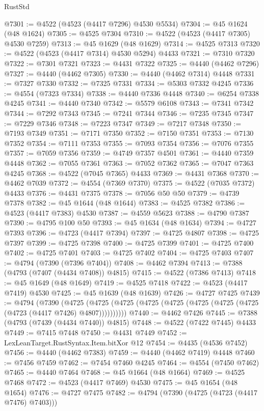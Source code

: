 \begin{lexlean}{RustStd}
\begin{coremodule}
@7301 := @4522 (@4523 (@4417 @7296) @4530 @5534)
@7304 := @45 @1624 (@48 @1624)
@7305 := @4525 @7304
@7310 := @4522 (@4523 (@4417 @7305) @4530 @7259)
@7313 := @45 @1629 (@48 @1629)
@7314 := @4525 @7313
@7320 := @4522 (@4523 (@4417 @7314) @4530 @5294) @4433
@7321 := @7310 @7320
@7322 := @7301 @7321
@7323 := @4431 @7322
@7325 := @4440 (@4462 @7296)
@7327 := @4440 (@4462 @7305)
@7330 := @4440 (@4462 @7314) @4448
@7331 := @7327 @7330
@7332 := @7325 @7331
@7334 := @5303 @7332 @4245
@7336 := @4554 (@7323 @7334)
@7338 := @4440 @7336 @4448
@7340 := @6254 @7338 @4245
@7341 := @4440 @7340
@7342 := @5579 @6108
@7343 := @7341 @7342
@7344 := @7292 @7343
@7345 := @7241 @7344
@7346 := @7235 @7345
@7347 := @7229 @7346
@7348 := @7223 @7347
@7349 := @7217 @7348
@7350 := @7193 @7349
@7351 := @7171 @7350
@7352 := @7150 @7351
@7353 := @7130 @7352
@7354 := @7111 @7353
@7355 := @7093 @7354
@7356 := @7076 @7355
@7357 := @7059 @7356
@7359 := @4749 @7357 @4501
@7361 := @4440 @7359 @4448
@7362 := @7055 @7361
@7363 := @7052 @7362
@7365 := @7047 @7363 @4245
@7368 := @4522 (@7045 @7365) @4433
@7369 := @4431 @7368
@7370 := @4462 @7039
@7372 := @4554 (@7369 @7370)
@7375 := @4522 (@7035 @7372) @4433
@7376 := @4431 @7375
@7378 := @7056 @50 @50
@7379 := @4739 @7378
@7382 := @45 @1644 (@48 @1644)
@7383 := @4525 @7382
@7386 := @4523 (@4417 @7383) @4530
@7387 := @4559 @5623
@7388 := @4790 @7387
@7390 := @4795 @100 @50
@7393 := @45 @1634 (@48 @1634)
@7394 := @4727 @7393
@7396 := @4723 (@4417 @7394)
@7397 := @4725 @4807
@7398 := @4725 @7397
@7399 := @4725 @7398
@7400 := @4725 @7399
@7401 := @4725 @7400
@7402 := @4725 @7401
@7403 := @4725 @7402
@7404 := @4725 @7403
@7407 := @4794 (@7390 (@7396 @7404))
@7408 := @4462 @7394
@7413 := @7388 (@4793 (@7407 (@4434 @7408)) @4815)
@7415 := @4522 (@7386 @7413)
@7418 := @45 @1649 (@48 @1649)
@7419 := @4525 @7418
@7422 := @4523 (@4417 @7419) @4530
@7425 := @45 @1639 (@48 @1639)
@7426 := @4727 @7425
@7439 := @4794
    (@7390
      (@4725 (@4725 (@4725 (@4725 (@4725 (@4725 (@4725 (@4725 (@4723 (@4417 @7426) @4807))))))))))
@7440 := @4462 @7426
@7445 := @7388 (@4793 (@7439 (@4434 @7440)) @4815)
@7448 := @4522 (@7422 @7445) @4433
@7449 := @7415 @7448
@7450 := @4431 @7449
@7452 := LexLeanTarget.RustSyntax.Item.bitXor @12
@7454 := @4435 (@4536 @7452)
@7456 := @4440 (@4462 @7383)
@7459 := @4440 (@4462 @7419) @4448
@7460 := @7456 @7459
@7462 := @7454 @7460 @4245
@7464 := @4554 (@7450 @7462)
@7465 := @4440 @7464
@7468 := @45 @1664 (@48 @1664)
@7469 := @4525 @7468
@7472 := @4523 (@4417 @7469) @4530
@7475 := @45 @1654 (@48 @1654)
@7476 := @4727 @7475
@7482 := @4794 (@7390 (@4725 (@4723 (@4417 @7476) @7403)))

\end{coremodule}
\end{lexlean}
